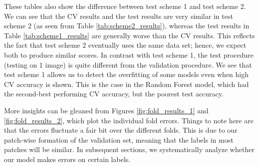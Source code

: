 \documentclass[11pt, letterpaper, journal]{IEEEtran}
\begin{document}
These tables also show the difference between test scheme 1 and test scheme 2. We can see that the CV results and the test results are very similar in test scheme 2 (as seen from Table \ref{tab:scheme2_results}), whereas the test results in Table \ref{tab:scheme1_results} are generally worse than the CV results. This reflects the fact that test scheme 2 eventually uses the same data set; hence, we expect both to produce similar scores. In contrast with test scheme 1, the test procedure (testing on 1 image) is quite different from the validation procedure. We see that test scheme 1 allows us to detect the overfitting of some models even when high CV accuracy is shown. This is the case in the Random Forest model, which had the second-best performing CV accuracy, but the poorest test accuracy.

More insights can be gleaned from Figures \ref{fig:fold_results_1} and \ref{fig:fold_results_2}, which plot the individual fold errors. Things to note here are that the errors fluctuate a fair bit over the different folds. This is due to our patch-wise formation of the validation set, meaning that the labels in most patches will be similar. In subsequent sections, we systematically analyze whether our model makes errors on certain labels. 

\begin{table}
\begin{center}
\caption{CV and test results for the 4 models under test scheme 1. "B.Acc" stands for balanced accuracy.}
\label{tab:scheme1_results}
\end{center}
\end{table}
\end{document}
